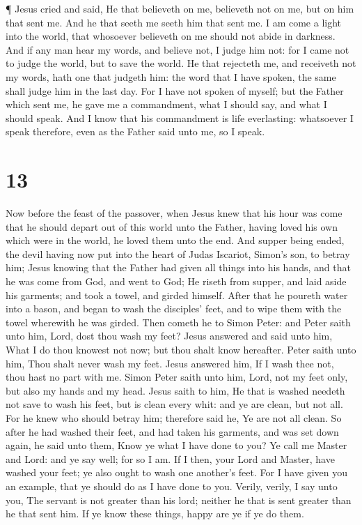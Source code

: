  ¶ Jesus cried and said, He that believeth on me, believeth
not on me, but on him that sent me.  And he that seeth me
seeth him that sent me.  I am come a light into the world,
that whosoever believeth on me should not abide in darkness.
 And if any man hear my words, and believe not, I judge him
not: for I came not to judge the world, but to save the world.
 He that rejecteth me, and receiveth not my words, hath one
that judgeth him: the word that I have spoken, the same shall judge him
in the last day.  For I have not spoken of myself; but the
Father which sent me, he gave me a commandment, what I should say, and
what I should speak.  And I know that his commandment is
life everlasting: whatsoever I speak therefore, even as the Father said
unto me, so I speak.

\hypertarget{section-12}{%
\section{13}\label{section-12}}

 Now before the feast of the passover, when Jesus knew that
his hour was come that he should depart out of this world unto the
Father, having loved his own which were in the world, he loved them unto
the end.  And supper being ended, the devil having now put
into the heart of Judas Iscariot, Simon's son, to betray him;
 Jesus knowing that the Father had given all things into his
hands, and that he was come from God, and went to God;  He
riseth from supper, and laid aside his garments; and took a towel, and
girded himself.  After that he poureth water into a bason,
and began to wash the disciples' feet, and to wipe them with the towel
wherewith he was girded.  Then cometh he to Simon Peter: and
Peter saith unto him, Lord, dost thou wash my feet?  Jesus
answered and said unto him, What I do thou knowest not now; but thou
shalt know hereafter.  Peter saith unto him, Thou shalt
never wash my feet. Jesus answered him, If I wash thee not, thou hast no
part with me.  Simon Peter saith unto him, Lord, not my feet
only, but also my hands and my head.  Jesus saith to him,
He that is washed needeth not save to wash his feet, but is clean every
whit: and ye are clean, but not all.  For he knew who
should betray him; therefore said he, Ye are not all clean.
 So after he had washed their feet, and had taken his
garments, and was set down again, he said unto them, Know ye what I have
done to you?  Ye call me Master and Lord: and ye say well;
for so I am.  If I then, your Lord and Master, have washed
your feet; ye also ought to wash one another's feet.  For I
have given you an example, that ye should do as I have done to you.
 Verily, verily, I say unto you, The servant is not greater
than his lord; neither he that is sent greater than he that sent him.
 If ye know these things, happy are ye if ye do them.

